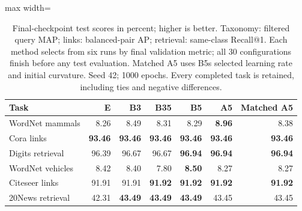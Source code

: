 \begin{table}[t]
\centering
\footnotesize\setlength{\tabcolsep}{4.2pt}\renewcommand{\arraystretch}{1.12}
\caption{Final-checkpoint test scores in percent; higher is better. Taxonomy: filtered query MAP; links: balanced-pair AP; retrieval: same-class Recall@1. Each method selects from six runs by final validation metric; all 30 configurations finish before any test evaluation. Matched A5 uses B5\textquotesingle s selected learning rate and initial curvature. Seed 42; 1000 epochs. Every completed task is retained, including ties and negative differences.}
\label{tab:new-tasks-all}
\begin{adjustbox}{max width=\linewidth}
\begin{tabular}{lrrrrrr}
\toprule
Task & E & B3 & B35 & B5 & A5 & Matched A5 \\
\midrule
WordNet mammals & 8.26 & 8.49 & 8.31 & \cellcolor{oursbg}8.29 & \textbf{8.96} & 8.38 \\
Cora links & \textbf{93.46} & \textbf{93.46} & \textbf{93.46} & \cellcolor{oursbg}\textbf{93.46} & \textbf{93.46} & \textbf{93.46} \\
Digits retrieval & 96.39 & 96.67 & 96.67 & \cellcolor{oursbg}\textbf{96.94} & \textbf{96.94} & \textbf{96.94} \\
WordNet vehicles & 8.42 & 8.40 & 7.80 & \cellcolor{oursbg}\textbf{8.50} & 8.27 & 8.27 \\
Citeseer links & 91.91 & 91.91 & \textbf{91.92} & \cellcolor{oursbg}\textbf{91.92} & \textbf{91.92} & \textbf{91.92} \\
20News retrieval & 42.31 & \textbf{43.49} & \textbf{43.49} & \cellcolor{oursbg}\textbf{43.49} & 43.45 & 43.45 \\
\bottomrule
\end{tabular}
\end{adjustbox}
\end{table}
